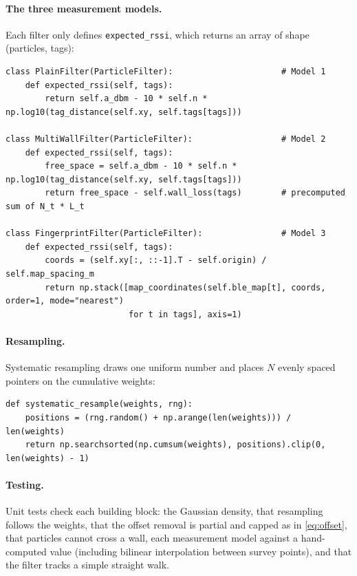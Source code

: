\documentclass[11pt,a4paper]{article}
\begin{document}
\paragraph{The three measurement models.} Each filter only defines
\texttt{expected\_rssi}, which returns an array of shape (particles, tags):
\begin{lstlisting}
class PlainFilter(ParticleFilter):                      # Model 1
    def expected_rssi(self, tags):
        return self.a_dbm - 10 * self.n * np.log10(tag_distance(self.xy, self.tags[tags]))

class MultiWallFilter(ParticleFilter):                  # Model 2
    def expected_rssi(self, tags):
        free_space = self.a_dbm - 10 * self.n * np.log10(tag_distance(self.xy, self.tags[tags]))
        return free_space - self.wall_loss(tags)        # precomputed sum of N_t * L_t

class FingerprintFilter(ParticleFilter):                # Model 3
    def expected_rssi(self, tags):
        coords = (self.xy[:, ::-1].T - self.origin) / self.map_spacing_m
        return np.stack([map_coordinates(self.ble_map[t], coords, order=1, mode="nearest")
                         for t in tags], axis=1)
\end{lstlisting}

\paragraph{Resampling.} Systematic resampling draws one uniform number and places $N$
evenly spaced pointers on the cumulative weights:
\begin{lstlisting}
def systematic_resample(weights, rng):
    positions = (rng.random() + np.arange(len(weights))) / len(weights)
    return np.searchsorted(np.cumsum(weights), positions).clip(0, len(weights) - 1)
\end{lstlisting}

\paragraph{Testing.} Unit tests check each building block: the Gaussian density, that
resampling follows the weights, that the offset removal is partial and capped as in
\cref{eq:offset}, that particles cannot cross a wall, each measurement model against a
hand-computed value (including bilinear interpolation between survey points), and that
the filter tracks a simple straight walk.

\end{document}
